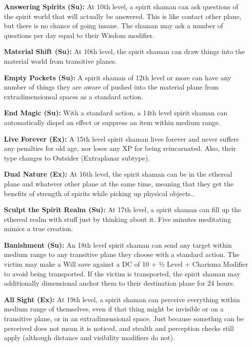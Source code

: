 \textbf{Answering Spirits (Su):} At 10th level, a spirit shaman can ask questions of the spirit world that will actually be answered. This is like contact other plane, but there is no chance of going insane. The shaman may ask a number of questions per day equal to their Wisdom modifier.

\textbf{Material Shift (Su):} At 10th level, the spirit shaman can draw things into the material world from transitive planes.

\textbf{Empty Pockets (Su):} A spirit shaman of 12th level or more can have any number of things they are aware of pushed into the material plane from extradimensionsal spaces as a standard action.

\textbf{End Magic (Su):} With a standard action, a 14th level spirit shaman can automatically dispel an effect or suppress an item within medium range.

\textbf{Live Forever (Ex):} A 15th level spirit shaman lives forever and never suffers any penalties for old age, nor loses any XP for being reincarnated. Also, their type changes to Outsider (Extraplanar subtype).

\textbf{Dual Nature (Ex):} At 16th level, the spirit shaman can be in the ethereal plane and whatever other plane at the same time, meaning that they get the benefits of strength of spirits while picking up physical objects..

\textbf{Sculpt the Spirit Realm (Su):} At 17th level, a spirit shaman can fill up the ethereal realm with stuff just by thinking about it. Five minutes meditating mimics a true creation.

\textbf{Banishment (Su):} An 18th level spirit shaman can send any target within medium range to any transitive plane they choose with a standard action. The victim may make a Will save against a DC of 10 + ½ Level + Charisma Modifier to avoid being transported. If the victim is transported, the spirit shaman may additionally dimensional anchor them to their destination plane for 24 hours.

\textbf{All Sight (Ex):} At 19th level, a spirit shaman can perceive everything within medium range of themselves, even if that thing might be invisible or on a transitive plane, or in an extradimensional space. Just because somethng can be perceived does not mean it is noticed, and stealth and perception checks still apply (although distance and visibility modifiers do not).
